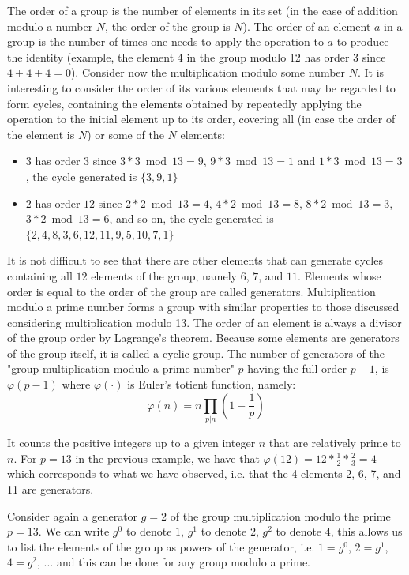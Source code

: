 The order of a group is the number of elements in its set (in the case of addition modulo a number $N$, the order of the group is $N$). The order of an element $a$ in a group is the number of times one needs to apply the operation to $a$ to produce the identity (example, the element 4 in the group modulo 12 has order 3 since $4+4+4=0$).
Consider now the multiplication modulo some number $N$. It is interesting to consider the order of its various elements that may be regarded to form cycles, containing the elements obtained by repeatedly applying the operation to the initial element up to its order, covering all (in case the order of the element is $N$) or some of the $N$ elements:
\begin{itemize}
		\item $3$ has order $3$ since $3*3 \bmod 13 = 9$, $9*3 \bmod 13 = 1$ and $1*3 \bmod 13 = 3$, the cycle generated is $\{ 3, 9, 1 \}$
	\item $2$ has order $12$ since $2*2 \bmod 13 = 4$, $4*2 \bmod 13 = 8$, $8*2 \bmod 13 = 3$, $3*2 \bmod 13 = 6$, and so on, the cycle generated is $\{ 2, 4, 8, 3, 6, 12, 11, 9, 5, 10, 7, 1 \}$
\end{itemize}

It is not difficult to see that there are other elements that can generate cycles containing all $12$ elements of the group, namely $6$, $7$, and $11$. Elements whose order is equal to the order of the group are called generators.
Multiplication modulo a prime number forms a group with similar properties to those discussed considering multiplication modulo 13. The order of an element is always a divisor of the group order by Lagrange's theorem. Because some elements are generators of the group itself, it is called a cyclic group. The number of generators of the "group multiplication modulo a prime number" $p$ having the full order $p - 1$, is $\varphi(p-1)$ where $\varphi(\cdot)$ is Euler's totient function, namely:
$$\varphi(n) = n \prod_{p|n}^{} (1- \frac{1}{p})$$

It counts the positive integers up to a given integer $n$ that are relatively prime to $n$. For $p=13$ in the previous example, we have that $\varphi(12) = 12 * \frac{1}{2} * \frac{2}{3} = 4$ which corresponds to what we have observed, i.e. that the 4 elements 2, 6, 7, and 11 are generators.

Consider again a generator $g=2$ of the group multiplication modulo the prime $p=13$. We can write $g^0$ to denote $1$, $g^1$ to denote $2$, $g^2$ to denote $4$, this allows us to list the elements of the group as powers of the generator, i.e. $1=g^0$, $2=g^1$, $4=g^2$, ... and this can be done for any group modulo a prime.

